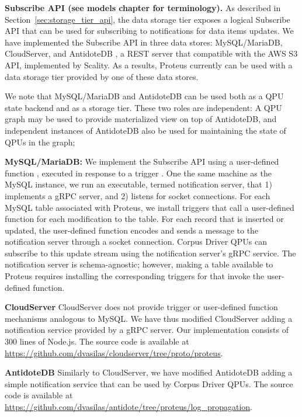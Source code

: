 \bigskip
\noindent
\textbf{Subscribe API (see models chapter for terminology).}
As described in Section~\ref{sec:storage_tier_api}, the data storage tier exposes a logical Subscribe API that can be
used for subscribing to notifications for data items updates.
We have implemented the Subscribe API in three data stores: MySQL/MariaDB, CloudServer, and AntidoteDB \cite{scality:cloudserver},
a REST server that compatible with the AWS S3 API, implemented by Scality.
As a results, Proteus currently can be used with a data storage tier provided by one of these data stores.

We note that MySQL/MariaDB and AntidoteDB can be used both as a QPU state backend and as a storage tier.
These two roles are independent:
A QPU graph may be used to provide materialized view on top of AntidoteDB,
and independent instances of AntidoteDB also be used for maintaining the state of QPUs in the graph;

\textbf{MySQL/MariaDB:}
We implement the Subscribe API using a user-defined function \cite{mariadb:udfs}, executed in response to a trigger \cite{mariadb:triggers}.
One the same machine as the MySQL instance, we run an executable, termed notification server,
that 1) implements a gRPC server, and 2) listens for socket connections.
For each MySQL table associated with Proteus, we install triggers that call a user-defined function for each modification to
the table.
For each record that is inserted or updated, the user-defined function encodes and sends a message to the notification
server through a socket connection.
Corpus Driver QPUs can subscribe to this update stream using the notification server's gRPC service.
The notification server is schema-agnostic; however, making a table available to Proteus requires installing the corresponding
triggers for that invoke the user-defined function.

\textbf{CloudServer}
CloudServer does not provide trigger or user-defined function mechanisms analogous to MySQL.
We have thus modified CloudServer adding a notification service provided by a gRPC server.
Our implementation consists of 300 lines of Node.js.
The source code is available at \url{https://github.com/dvasilas/cloudserver/tree/proto/proteus}.

\textbf{AntidoteDB}
Similarly to CloudServer, we have modified AntidoteDB adding a simple notification service that can be used by Corpus Driver QPUs.
The source code is available at \url{https://github.com/dvasilas/antidote/tree/proteus/log_propagation}.

